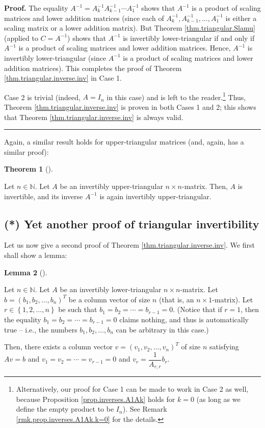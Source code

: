 \documentclass[numbers=enddot,12pt,final,onecolumn,notitlepage]{scrartcl}%
\theoremstyle{definition}
\newtheorem{theo}{Theorem}[section]
\newenvironment{theorem}[1][]
{\begin{theo}[#1]\begin{leftbar}}
{\end{leftbar}\end{theo}}
\newtheorem{lem}[theo]{Lemma}
\newenvironment{lemma}[1][]
{\begin{lem}[#1]\begin{leftbar}}
{\end{leftbar}\end{lem}}
\newenvironment{proof}[1][Proof]{\noindent\textbf{#1.} }{\ \rule{0.5em}{0.5em}}
\begin{document}
\begin{proof}
The equality $A^{-1}=A_{k}^{-1}A_{k-1}^{-1}\cdots A_{1}^{-1}$ shows that
$A^{-1}$ is a product of scaling matrices and lower addition matrices (since
each of $A_{k}^{-1},A_{k-1}^{-1},\ldots,A_{1}^{-1}$ is either a scaling matrix
or a lower addition matrix). But Theorem \ref{thm.triangular.Slamu} (applied
to $C=A^{-1}$) shows that $A^{-1}$ is invertibly lower-triangular if and only
if $A^{-1}$ is a product of scaling matrices and lower addition matrices.
Hence, $A^{-1}$ is invertibly lower-triangular (since $A^{-1}$ is a product of
scaling matrices and lower addition matrices). This completes the proof of
Theorem \ref{thm.triangular.inverse.inv} in Case 1.

Case 2 is trivial (indeed, $A=I_{n}$ in this case) and is left to the
reader.\footnote{Alternatively, our proof for Case 1 can be made to work in
Case 2 as well, because Proposition \ref{prop.inverses.A1Ak} holds for $k=0$
(as long as we define the empty product to be $I_{n}$). See Remark
\ref{rmk.prop.inverses.A1Ak.k=0} for the details.} Thus, Theorem
\ref{thm.triangular.inverse.inv} is proven in both Cases 1 and 2; this shows
that Theorem \ref{thm.triangular.inverse.inv} is always valid.
\end{proof}

Again, a similar result holds for upper-triangular matrices (and, again, has a
similar proof):

\begin{theorem}
\label{thm.triangular.inverse-up.inv}Let $n\in\mathbb{N}$. Let $A$ be an
invertibly upper-triangular $n\times n$-matrix. Then, $A$ is invertible, and
its inverse $A^{-1}$ is again invertibly upper-triangular.
\end{theorem}

\subsection{(*) Yet another proof of triangular invertibility}

Let us now give a second proof of Theorem \ref{thm.triangular.inverse.inv}. We
first shall show a lemma:

\begin{lemma}
\label{lem.triangular.inverse.inv.3rd.1}Let $n\in\mathbb{N}$. Let $A$ be an
invertibly lower-triangular $n\times n$-matrix. Let $b=\left(  b_{1}%
,b_{2},\ldots,b_{n}\right)  ^{T}$ be a column vector of size $n$ (that is, an
$n\times1$-matrix). Let $r\in\left\{  1,2,\ldots,n\right\}  $ be such that
$b_{1}=b_{2}=\cdots=b_{r-1}=0$. (Notice that if $r=1$, then the equality
$b_{1}=b_{2}=\cdots=b_{r-1}=0$ claims nothing, and thus is automatically true
-- i.e., the numbers $b_{1},b_{2},\ldots,b_{n}$ can be arbitrary in this case.)

Then, there exists a column vector $v=\left(  v_{1},v_{2},\ldots,v_{n}\right)
^{T}$ of size $n$ satisfying $Av=b$ and $v_{1}=v_{2}=\cdots=v_{r-1}=0$ and
$v_{r}=\dfrac{1}{A_{r,r}}b_{r}$.
\end{lemma}
\end{document}
